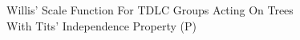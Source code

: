 \documentclass[preview]{standalone}
\begin{document}
\begin{center}
Willis' Scale Function For TDLC Groups Acting On Trees \\ With Tits' Independence Property (P)
\end{center}
\end{document}
